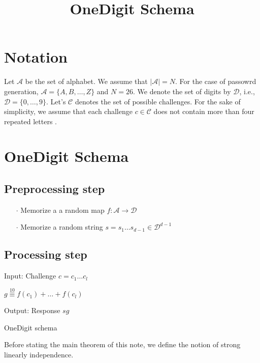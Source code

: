 \documentclass{article}
\title{\LARGE OneDigit Schema}
\author{}
\newenvironment{alg}{
    \begin{list}{}{
        \setlength{\itemsep}{2pt}
        \setlength{\parsep}{0pt}
        \setlength{\parskip}{0pt}
        \setlength{\topsep}{1pt}
    }
}
{
    \end{list}
}
\begin{document}
\maketitle

\section{Notation}
Let $\mathcal{A}$ be the set of alphabet. We assume that $|\mathcal{A}|=N$. For the case of passowrd generation, $\mathcal{A}=\{A,B,\ldots,Z\}$ and $N=26$. We denote the set of digits by $\mathcal{D}$, i.e., $\mathcal{D}=\{0,\ldots,9\}$. Let's $\mathcal{C}$ denotes the set of possible challenges. For the sake of simplicity, we assume that each challenge $c\in\mathcal{C}$ does not contain more than four repeated letters	.

\section{OneDigit Schema}

\subsection{Preprocessing step}
\begin{itemize}
	\item[$\cdot$] Memorize a a random map $f:\mathcal{A} \to \mathcal{D}$
	\item[$\cdot$] Memorize a random string $s = s_1 \ldots s_{d-1}\in \mathcal{D}^{d-1}$
\end{itemize}

\subsection{Processing step}

\begin{algorithm}
\label{OneDigit}
\begin{alg}
\item[] Input: Challenge $c=c_1 \ldots c_l$
\item[] $g \overset{10}{\equiv} f(c_1)+\ldots +f(c_l)$
\item[] Output: Response $sg$
\label{alg:NotKnown}
\end{alg}
\caption{OneDigit schema}
\end{algorithm}

Before stating the main theorem of this note, we define the notion of strong linearly independence.
\end{document}
